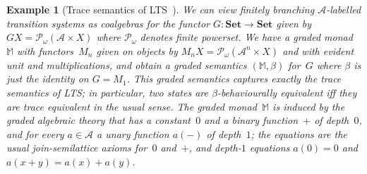 \documentclass[11pt,a4paper]{amsart}
\newtheorem{example}[example]{Example}
\newcommand{\pow}{\mathcal{P}}
\newcommand{\powf}{\pow_{\omega}}
\theoremstyle{plain}
\numberwithin{equation}{section}
\newcommand{\monad}{{\mathbb{M}}}
\newcommand{\Set}{\mathbf{Set}}
\newcommand{\+}[1]{\mathcal{#1}\xspace}
\theoremstyle{definition}
\newcommand{\Act}{\mathcal{A}}
\begin{document}
\begin{example}[Trace semantics of LTS~\cite{DorschEA19}]
  \label{expl:traces}
  We can view finitely branching $\Act$-labelled transition systems as
  coalgebras for the functor \(G\colon \Set \to \Set\) given by
  $GX = \powf(\Act \times X)$ where $\powf$ denotes finite
  powerset. We have a graded monad~$\monad$ with functors~$M_n$ given
  on objects by \(M_nX = \powf(\Act^n \times X)\) and with evident
  unit and multiplications, and obtain a graded semantics
  $(\monad,\beta)$ for~$G$ where \(\beta\) is just the identity on
  $G=M_1$. This graded semantics captures exactly the trace semantics
  of LTS; in particular, two states are $\beta$-behaviourally
  equivalent iff they are trace equivalent in the usual sense. The
  graded monad~$\monad$ is induced by the graded algebraic theory that
  has a constant~$0$ and a binary function~$+$ of depth~$0$, and for
  every $a\in\Act$ a unary function $a(-)$ of depth~$1$; the equations
  are the usual join-semilattice axioms for~$0$ and~$+$, and depth-$1$
  equations $a(0)=0$ and $a(x+y)=a(x)+a(y)$.
\end{example}
\end{document}
